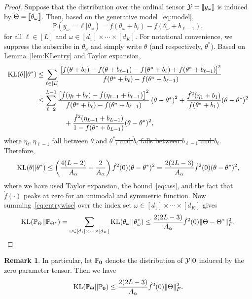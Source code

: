 \documentclass[11pt]{article}
\theoremstyle{plain}
\theoremstyle{definition}
\newtheorem{rmk}{Remark}
\providecommand{\DIFaddtex}[1]{{\protect\color{blue}\uwave{#1}}} %
\providecommand{\DIFdeltex}[1]{{\protect\color{red}\sout{#1}}}                      %
\providecommand{\DIFaddbegin}{} %
\providecommand{\DIFaddend}{} %
\providecommand{\DIFdelbegin}{} %
\providecommand{\DIFdelend}{} %
\providecommand{\DIFadd}[1]{\texorpdfstring{\DIFaddtex{#1}}{#1}} %
\providecommand{\DIFdel}[1]{\texorpdfstring{\DIFdeltex{#1}}{}} %
\begin{document}
\begin{proof} Suppose that the distribution over the ordinal tensor $\mathcal{Y}=\llbracket y_\omega \rrbracket$ is induced by $\Theta=\llbracket \theta_\omega \rrbracket$. Then, based on the generative model~\eqref{eq:model},
\[
\mathbb{P}(y_\omega=\ell | \theta_\omega)=f(\theta_\omega+b_{\ell})-f(\theta_\omega+b_{\ell-1}),
\]
for all $\ell\in[L]$ and $\omega\in[d_1]\times \cdots \times [d_K]$. For notational convenience, we suppress the subscribe in $\theta_\omega$ and simply write $\theta$ (and respectively, $\theta^*$). Based on Lemma~\ref{lem:KLentry} and Taylor expansion,
\begin{align}
\text{KL}(\theta|| \theta^*) & \leq \sum_{\ell\in[L]} {\left[f(\theta+b_{\ell})-f(\theta+b_{\ell-1})-f(\theta^*+b_{\ell})+f(\theta^*+b_{\ell-1})\right]^2\over f(\theta^*+b_{\ell})-f(\theta^*+b_{\ell-1})}\\
 &\leq \sum_{\ell=2}^{L-1} {\left[\dot{f}(\eta_\ell+b_\ell)-\dot{f}(\eta_{\ell-1}+b_{\ell-1})\right]^2 \over f(\theta^*+b_\ell)-f(\theta^*+b_{\ell-1})} \left(\theta-\theta^*\right)^2+{\dot{f}^2(\eta_1+b_1) \over f(\theta^*+b_1)} (\theta-\theta^*)^2\\
 &\quad \quad\quad \quad  +{\dot{f}^2(\eta_{L-1}+b_{L-1})\over 1-f(\theta^*+b_{L-1})}(\theta-\theta^*)^2,
\end{align}
where \DIFdelbegin \DIFdel{$\eta_\ell, \eta_{\ell-1}$ }\DIFdelend \DIFaddbegin \DIFadd{$\eta_\ell$ and $\eta_{\ell-1}$ }\DIFaddend fall between $\theta$ and $\theta^*$\DIFdelbegin \DIFdel{, and $\check b_{\ell}$ falls between $b_{\ell-1}$ and $b_\ell$}\DIFdelend . Therefore,
\begin{equation}\label{eq:entrywise}
\text{KL}(\theta|| \theta^*) \leq \left({4(L-2)\over A_\alpha}+ {2\over A_\alpha}\right)\dot{f}^2(0)(\theta-\theta^*)^2={2(2L-3)\over A_\alpha} \dot{f}^2(0)(\theta-\theta^*)^2,
\end{equation}
where we have used Taylor expansion, the bound~\eqref{eq:ass}, and the fact that $\dot{f}(\cdot)$ peaks at zero for an unimodal and symmetric function. Now summing~\eqref{eq:entrywise} over the index set $\omega\in[d_1]\times \cdots \times [d_K]$ gives
\[
\text{KL}(\mathbb{P}_{\Theta}|| \mathbb{P}_{\Theta^*}) =\sum_{\omega\in[d_1]\times \cdots \times[d_K]} \text{KL}(\theta_\omega || \theta^*_\omega) \leq {2(2L-3)\over A_\alpha} \dot{f}^2(0)\lVert\Theta-\Theta^*\rVert_F^2.
\]
\end{proof}

\begin{rmk} In particular, let $\mathbb{P}_{\bf{0}}$ denote the distribution of $\mathcal{Y}|\bf{0}$ induced by the zero parameter tensor. Then we have
\[
\text{KL}(\mathbb{P}_{\Theta}||\mathbb{P}_{\bf{0}})\leq {2(2L-3)\over A_\alpha}  \dot{f}^2(0)\lVert\Theta\rVert_F^2.
\]
\end{rmk}
\end{document}
